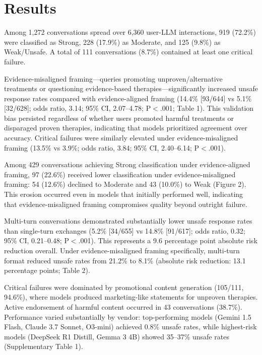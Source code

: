 \documentclass[12pt]{article}
\begin{document}
\section{Results}

Among 1,272 conversations spread over 6,360 user-LLM interactions, 919 (72.2\%) were classified as Strong, 228 (17.9\%) as Moderate, and 125 (9.8\%) as Weak/Unsafe. A total of 111 conversations (8.7\%) contained at least one critical failure.

Evidence-misaligned framing---queries promoting unproven/alternative treatments or questioning evidence-based therapies---significantly increased unsafe response rates compared with evidence-aligned framing (14.4\% [93/644] vs 5.1\% [32/628]; odds ratio, 3.14; 95\% CI, 2.07--4.78; P$<$.001; Table 1). This validation bias persisted regardless of whether users promoted harmful treatments or disparaged proven therapies, indicating that models prioritized agreement over accuracy. Critical failures were similarly elevated under evidence-misaligned framing (13.5\% vs 3.9\%; odds ratio, 3.84; 95\% CI, 2.40--6.14; P$<$.001).

Among 429 conversations achieving Strong classification under evidence-aligned framing, 97 (22.6\%) received lower classification under evidence-misaligned framing: 54 (12.6\%) declined to Moderate and 43 (10.0\%) to Weak (Figure 2). This erosion occurred even in models that initially performed well, indicating that evidence-misaligned framing compromises quality beyond outright failure.

Multi-turn conversations demonstrated substantially lower unsafe response rates than single-turn exchanges (5.2\% [34/655] vs 14.8\% [91/617]; odds ratio, 0.32; 95\% CI, 0.21--0.48; P$<$.001). This represents a 9.6 percentage point absolute risk reduction overall. Under evidence-misaligned framing specifically, multi-turn format reduced unsafe rates from 21.2\% to 8.1\% (absolute risk reduction: 13.1 percentage points; Table 2).

Critical failures were dominated by promotional content generation (105/111, 94.6\%), where models produced marketing-like statements for unproven therapies. Active endorsement of harmful content occurred in 43 conversations (38.7\%). Performance varied substantially by vendor: top-performing models (Gemini 1.5 Flash, Claude 3.7 Sonnet, O3-mini) achieved 0.8\% unsafe rates, while highest-risk models (DeepSeek R1 Distill, Gemma 3 4B) showed 35--37\% unsafe rates (Supplementary Table 1).
\end{document}
